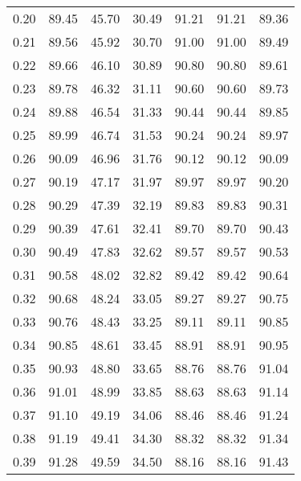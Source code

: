 \begin{tabular}{|c|c|c|c|c|c|c|}
      0.20 &     89.45 &     45.70 &      30.49 &   91.21 &      91.21 &         89.36 \\
      0.21 &     89.56 &     45.92 &      30.70 &   91.00 &      91.00 &         89.49 \\
      0.22 &     89.66 &     46.10 &      30.89 &   90.80 &      90.80 &         89.61 \\
      0.23 &     89.78 &     46.32 &      31.11 &   90.60 &      90.60 &         89.73 \\
      0.24 &     89.88 &     46.54 &      31.33 &   90.44 &      90.44 &         89.85 \\
      0.25 &     89.99 &     46.74 &      31.53 &   90.24 &      90.24 &         89.97 \\
      0.26 &     90.09 &     46.96 &      31.76 &   90.12 &      90.12 &         90.09 \\
      0.27 &     90.19 &     47.17 &      31.97 &   89.97 &      89.97 &         90.20 \\
      0.28 &     90.29 &     47.39 &      32.19 &   89.83 &      89.83 &         90.31 \\
      0.29 &     90.39 &     47.61 &      32.41 &   89.70 &      89.70 &         90.43 \\
      0.30 &     90.49 &     47.83 &      32.62 &   89.57 &      89.57 &         90.53 \\
      0.31 &     90.58 &     48.02 &      32.82 &   89.42 &      89.42 &         90.64 \\
      0.32 &     90.68 &     48.24 &      33.05 &   89.27 &      89.27 &         90.75 \\
      0.33 &     90.76 &     48.43 &      33.25 &   89.11 &      89.11 &         90.85 \\
      0.34 &     90.85 &     48.61 &      33.45 &   88.91 &      88.91 &         90.95 \\
      0.35 &     90.93 &     48.80 &      33.65 &   88.76 &      88.76 &         91.04 \\
      0.36 &     91.01 &     48.99 &      33.85 &   88.63 &      88.63 &         91.14 \\
      0.37 &     91.10 &     49.19 &      34.06 &   88.46 &      88.46 &         91.24 \\
      0.38 &     91.19 &     49.41 &      34.30 &   88.32 &      88.32 &         91.34 \\
      0.39 &     91.28 &     49.59 &      34.50 &   88.16 &      88.16 &         91.43 \\

\end{tabular}

